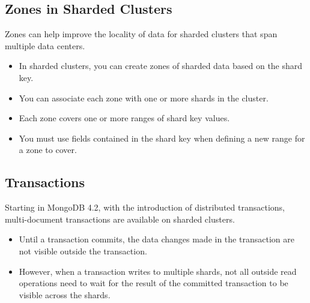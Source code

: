 \subsection{Zones in Sharded Clusters}
Zones can help improve the locality of data for sharded clusters that span multiple data centers.
\begin{itemize}
    \item In sharded clusters, you can create zones of sharded data based on the shard key.
    \item You can associate each zone with one or more shards in the cluster.
    \item Each zone covers one or more ranges of shard key values.
    \item You must use fields contained in the shard key when defining a new range for a zone to cover.
\end{itemize}

\subsection{Transactions}
Starting in MongoDB 4.2, with the introduction of distributed transactions, multi-document transactions are available on sharded clusters.
\begin{itemize}
    \item Until a transaction commits, the data changes made in the transaction are not visible outside the transaction.
    \item However, when a transaction writes to multiple shards, not all outside read operations need to wait for the result of the committed transaction to be visible across the shards.
\end{itemize}